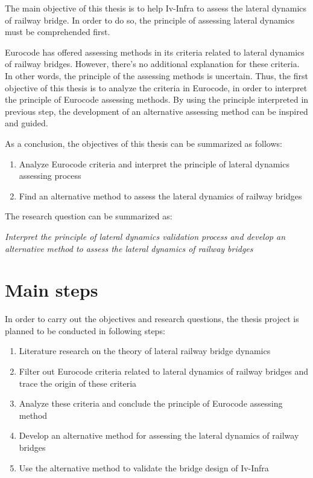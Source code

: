 The main objective of this thesis is to help Iv-Infra to assess the lateral dynamics of railway bridge. In order to do so, the principle of assessing lateral dynamics must be comprehended first. 

Eurocode has offered assessing methods in its criteria related to lateral dynamics of railway bridges. However, there's no additional explanation for these criteria. In other words, the principle of the assessing methods is uncertain. Thus, the first objective of this thesis is to analyze the criteria in Eurocode, in order to interpret the principle of Eurocode assessing methods. By using the principle interpreted in previous step, the development of an alternative assessing method can be inspired and guided. 

As a conclusion, the objectives of this thesis can be summarized as follows:

\begin{enumerate}[-]

\item Analyze Eurocode criteria and interpret the principle of lateral dynamics assessing process
\item Find an alternative method to assess the lateral dynamics of railway bridges

\end{enumerate}

\vspace*{0.5cm}

The research question can be summarized as:

\vspace*{0.5cm}

\emph{Interpret the principle of lateral dynamics validation process and develop an alternative method to assess the lateral dynamics of railway bridges}


\section{Main steps}

In order to carry out the objectives and research questions, the thesis project is planned to be conducted in following steps:

\begin{enumerate}

\item Literature research on the theory of lateral railway bridge dynamics

\item Filter out Eurocode criteria related to lateral dynamics of railway bridges and trace the origin of these criteria

\item Analyze these criteria and conclude the principle of Eurocode assessing method

\item Develop an alternative method for assessing the lateral dynamics of railway bridges

\item Use the alternative method to validate the bridge design of Iv-Infra

\end{enumerate}

